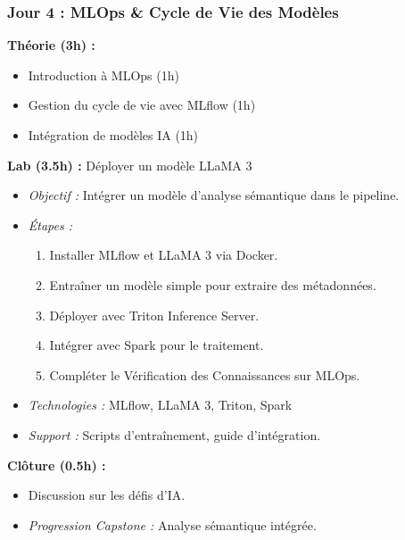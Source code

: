 \documentclass[11pt]{article}
\begin{document}
\subsubsection{Jour 4 : MLOps \& Cycle de Vie des Modèles}
\textbf{Théorie (3h) :}
\begin{itemize}
    \item Introduction à MLOps (1h)
    \item Gestion du cycle de vie avec MLflow (1h)
    \item Intégration de modèles IA (1h)
\end{itemize}
\textbf{Lab (3.5h) :} Déployer un modèle LLaMA 3
\begin{itemize}
    \item \textit{Objectif :} Intégrer un modèle d'analyse sémantique dans le pipeline.
    \item \textit{Étapes :}
        \begin{enumerate}
            \item Installer MLflow et LLaMA 3 via Docker.
            \item Entraîner un modèle simple pour extraire des métadonnées.
            \item Déployer avec Triton Inference Server.
            \item Intégrer avec Spark pour le traitement.
            \item Compléter le Vérification des Connaissances sur MLOps.
        \end{enumerate}
    \item \textit{Technologies :} MLflow, LLaMA 3, Triton, Spark
    \item \textit{Support :} Scripts d'entraînement, guide d'intégration.
\end{itemize}
\textbf{Clôture (0.5h) :}
\begin{itemize}
    \item Discussion sur les défis d'IA.
    \item \textit{Progression Capstone :} Analyse sémantique intégrée.
\end{itemize}
\end{document}
